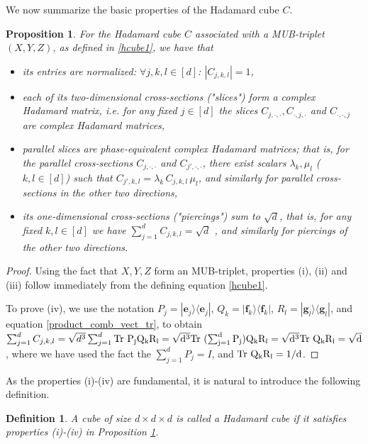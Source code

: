 \documentclass[12pt]{amsart}
\numberwithin{equation}{section}
\newtheorem{defi}[fact]{Definition}
\newtheorem{proposition}[fact]{Proposition}
\newenvironment{definition}{\begin{defi} \rm}{\end{defi}}
\theoremstyle{definition}
\theoremstyle{remark}
\theoremstyle{remark}
\newcommand{\gb}{\ensuremath{\mathbf{g}}}
\newcommand{\eb}{\ensuremath{\mathbf{e}}}
\newcommand{\fb}{\ensuremath{\mathbf{f}}}
\begin{document}
\medskip

We now summarize the basic properties of the Hadamard cube $C$. 

\begin{proposition}\label{hcube}
For the Hadamard cube $C$ associated with a MUB-triplet $(X, Y, Z)$, as defined in \eqref{hcube1}, we have that
\begin{itemize}
    \item[i)] its entries are normalized: $\forall j,k,l\in[d]$: $|C_{j,k,l}|=1$,
    \item[ii)] each of its two-dimensional cross-sections ("slices") form a complex Hadamard matrix, i.e. for any fixed $j\in [d]$ the slices $C_{j,\cdot,\cdot}, C_{\cdot,j,\cdot}$ and $C_{\cdot,\cdot,j}$ are complex Hadamard matrices, 
    \item[iii)] parallel slices are phase-equivalent complex 
    Hadamard matrices; that is, for the parallel cross-sections $C_{j,\cdot,\cdot}$ and 
    $C_{j',\cdot,\cdot}$,  there exist scalars $\lambda_k, \mu_l$ ($k, l\in [d]$) such that $C_{j',k,l}=\lambda_k \, C_{j,k,l}\,\mu_l$, and similarly for parallel cross-sections in the other two directions,

    \item[iv)] its one-dimensional cross-sections ("piercings") sum to $\sqrt{d}$, that is, for any fixed $k,l\in[d]$ we have $\sum_{j=1}^d C_{j,k,l}=\sqrt{d}$ , and similarly for piercings of the other two directions.
\end{itemize}
\end{proposition}

\begin{proof}

Using the fact that $X,Y, Z$ form an MUB-triplet, properties (i), (ii) and (iii) follow immediately from the defining equation \eqref{hcube1}.  

To prove (iv), we use the notation $P_j=|\eb_j\rangle \langle \eb_j|$, $Q_k=|\fb_k\rangle \langle \fb_k|$, $R_l=|\gb_l\rangle \langle \gb_l|$, and equation \eqref{product_comb_vect_tr}, to obtain
$\sum_{j=1}^d C_{j,k,l}=\sqrt{d^3}
\sum_{j=1}^d \rm{Tr} \ P_jQ_kR_l=\sqrt{d^3}
\rm{Tr} \ (\sum_{j=1}^d P_j)Q_kR_l=\sqrt{d^3}\rm{Tr} \ Q_kR_l=\sqrt{d}$, where we have used the fact the $\sum_{j=1}^d P_j=I$, and $\rm{Tr} \ Q_kR_l=1/d$. 
\end{proof}

As the properties (i)-(iv) are fundamental, it is natural to introduce the following definition. 

\begin{definition}
A cube of size $d\times d\times d$ is called a \emph{Hadamard cube} if it satisfies properties (i)-(iv) in Proposition \ref{hcube}.
\end{definition}
    
\end{document}
